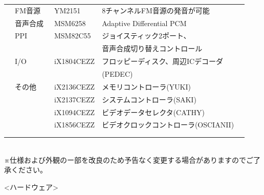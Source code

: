 ﻿\documentclass[twoside,a4paper,12pt]{article}
\begin{document}
\begin{tabular}{|p{13mm}|p{25mm}|p{22mm}|p{73mm}|p{30mm}|}
& FM音源 & \ YM2151 & 8チャンネルFM音源の発音が可能 &\\
& 音声合成 & \ MSM6258 & Adaptive Differential PCM &\\
& PPI & \ MSM82C55 & ジョイスティック2ポート、 &\\
& & & 音声合成切り替えコントロール &\\
& I/O & \ iX1804CEZZ & フロッピーディスク、周辺ICデコーダ &\\
& & & (PEDEC) &\\
& その他 & \ iX2136CEZZ & メモリコントローラ(YUKI) &\\
& & \ iX2137CEZZ & システムコントローラ(SAKI) &\\
& & \ iX1094CEZZ & ビデオデータセレクタ(CATHY) &\\
& & \ iX1856CEZZ & ビデオクロックコントローラ(OSCIANII) &\\
& & & &\\
& & & &\\
\hline
\end{tabular}\\

※仕様および外観のー部を改良のため予告なく変更する場合がありますのでご了承ください。

\newpage

<ハードウェア>
\end{document}
